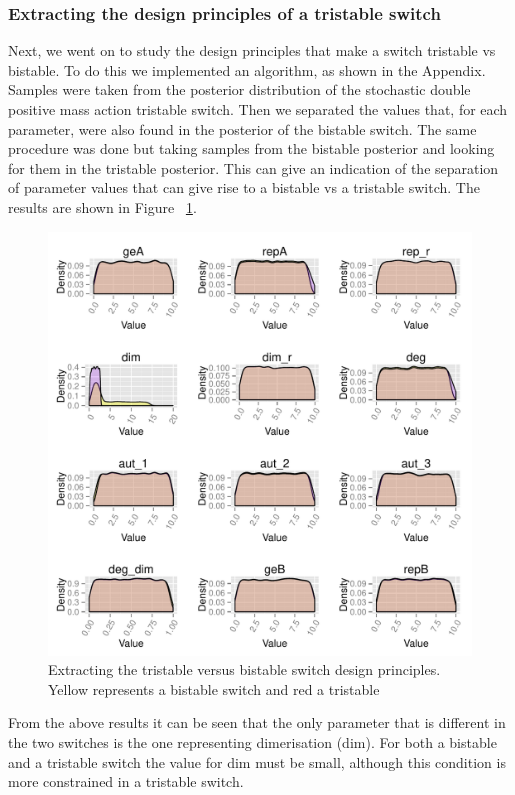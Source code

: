 \subsubsection{Extracting the design principles of a tristable switch}
Next, we went on to study the design principles that make a switch tristable vs bistable. To do this we implemented an algorithm, as shown in the Appendix. Samples were taken from the posterior distribution of the stochastic double positive mass action tristable switch. Then we separated the values that, for each parameter, were also found in the posterior of the bistable switch. The same procedure was done but taking samples from the bistable posterior and looking for them in the tristable posterior. This can give an indication of the separation of parameter values that can give rise to a bistable vs a tristable switch. The results are shown in Figure ~\ref{fig:design_pr_ma_dp}.

\begin{figure}[h!]
\begin{center}
\includegraphics[scale=0.6]{chapterModelling/mass_action_stochastic_switches/bi_tri_same_priors/design_principles_pos_ab.pdf}
\caption{Extracting the tristable versus bistable switch design principles. Yellow represents a bistable switch and red a tristable}\label{fig:design_pr_ma_dp}
\end{center}
\end{figure}

From the above results it can be seen that the only parameter that is different in the two switches is the one representing dimerisation (dim). For both a bistable and a tristable switch the value for dim must be small, although this condition is more constrained in a tristable switch.
